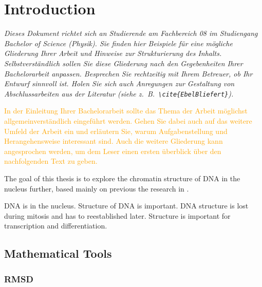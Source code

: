 \documentclass[a4paper,11pt,oneside,final,english,toc=bib,draft]{scrbook}
\begin{document}
\tableofcontents
\clearpage

\mainmatter
\sloppy

% 
\chapter{Introduction} %
\label{cha:introduction}

{\em Dieses Dokument richtet sich an Studierende am Fachbereich 08 im 
Studiengang Bachelor of Science (Physik). Sie finden hier Beispiele 
für eine mögliche Gliederung Ihrer Arbeit und Hinweise zur 
Strukturierung des Inhalts. Selbstverständlich sollen Sie diese 
Gliederung nach den Gegebenheiten Ihrer Bachelorarbeit anpassen. 
Besprechen Sie rechtzeitig mit Ihrem Betreuer, ob Ihr Entwurf sinnvoll 
ist. Holen Sie sich auch Anregungen zur Gestaltung von Abschlussarbeiten 
aus der Literatur (siehe z.\ B.\ \verb|\cite{EbelBliefert}|).}

\medskip

\textcolor{orange}{In der Einleitung Ihrer Bachelorarbeit sollte das Thema der Arbeit 
möglichst allgemeinverständlich eingeführt werden. Gehen Sie 
dabei auch auf das weitere Umfeld der Arbeit ein und erläutern Sie, 
warum Aufgabenstellung und Herangehensweise interessant sind. Auch 
die weitere Gliederung kann angesprochen werden, um dem Leser einen 
ersten überblick über den nachfolgenden Text zu geben.}

\bigskip

The goal of this thesis is to explore the chromatin structure of DNA in the nucleus further, based mainly on previous the research in \cite{wettermann_minimal_2020}.

DNA is in the nucleus. Structure of DNA is important. DNA structure is lost during mitosis and has to reestablished later. Structure is important for transcription and differentiation.

\bigskip

\section{Mathematical Tools} %
\label{sec:mathematical_tools}

\subsection{RMSD} %
\label{sec:rmsd}
\end{document}
